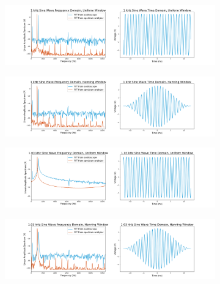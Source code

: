 \documentclass[12pt]{article}
\begin{document}
    \begin{figure}[!ht]
        \centering
        \begin{subfigure}[h]{\textwidth}
        \includegraphics[width=\textwidth]{1 kHz Sine Wave (uniform)}
        \caption{}
        \label{fig:1 sine uniform}
        \end{subfigure}
        \begin{subfigure}[h]{\textwidth}
        \includegraphics[width=\textwidth]{1 kHz Sine Wave (hanning)}
        \caption{}
        \label{fig:1 sine hanning}
        \end{subfigure}
        \begin{subfigure}[h]{\textwidth}
        \includegraphics[width=\textwidth]{1_03 kHz Sine Wave (uniform)}
        \caption{}
        \label{fig:1.03 sine uniform}
        \end{subfigure}
        \begin{subfigure}[h]{\textwidth}
        \includegraphics[width=\textwidth]{1_03 kHz Sine Wave (hanning)}
        \caption{}
        \label{fig:1.03 sine hanning}
        \end{subfigure}
    \end{figure} %
    
\end{document}
